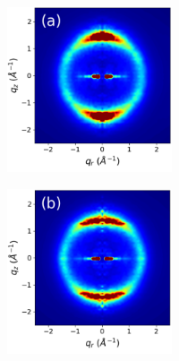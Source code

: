 \documentclass[journal=jpcbfk,manuscript=article]{achemso}
\begin{document}
  \begin{figure}[!htb]
	\centering
	\begin{subfigure}{0.88\textwidth}
	\begin{subfigure}{0.28\linewidth}
			\begin{subfigure}{\textwidth}
			\centering
		        	\includegraphics[width=\linewidth]{rzplot_layered_300K_jet_nocbar.pdf}
			\end{subfigure}
			\begin{subfigure}{\textwidth}
		       		\centering
	        		\includegraphics[width=\linewidth]{rzplot_layered_300K_disorder_jet_nocbar.pdf}

\end{subfigure}
\end{subfigure}
\end{subfigure}
\end{figure}
\end{document}
